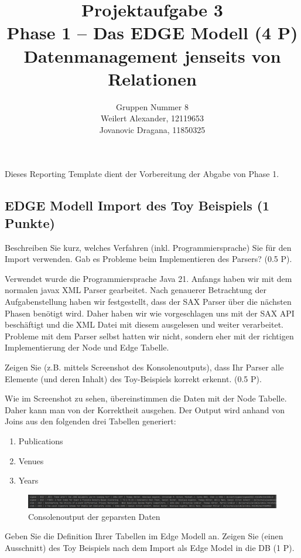 \documentclass[11pt]{scrartcl}
\title{
  \textbf{\large Projektaufgabe 3 } \\
  Phase 1 – Das EDGE Modell (4 P) \\
  {\large Datenmanagement jenseits von Relationen}
}
\author{
  Gruppen Nummer 8 \\
  \large Weilert Alexander, 12119653 \\
  \large Jovanovic Dragana, 11850325
}
\begin{document}
\maketitle\thispagestyle{empty}

Dieses Reporting Template dient der Vorbereitung der Abgabe von Phase 1.

\subsection*{EDGE Modell Import des Toy Beispiels (1 Punkte)}

Beschreiben Sie kurz, welches Verfahren (inkl. Programmiersprache) Sie für den Import verwenden. Gab es Probleme beim Implementieren des Parsers? (0.5 P).

Verwendet wurde die Programmiersprache Java 21.
Anfangs haben wir mit dem normalen javax XML Parser gearbeitet.
Nach genauerer Betrachtung der Aufgabenstellung haben wir festgestellt, dass der SAX Parser über die nächsten Phasen benötigt wird.
Daher haben wir wie vorgeschlagen uns mit der SAX API beschäftigt und die XML Datei mit diesem ausgelesen und weiter verarbeitet.
Probleme mit dem Parser selbst hatten wir nicht, sondern eher mit der richtigen Implementierung der Node und Edge Tabelle.

Zeigen Sie (z.B. mittels Screenshot des Konsolenoutputs), dass Ihr Parser alle Elemente (und deren Inhalt) des Toy-Beispiels korrekt erkennt. (0.5 P).

Wie im Screenshot zu sehen, übereinstimmen die Daten mit der Node Tabelle.
Daher kann man von der Korrektheit ausgehen.
Der Output wird anhand von Joins aus den folgenden drei Tabellen generiert:
\begin{enumerate}
    \item Publications
    \item Venues
    \item Years
\end{enumerate}
\begin{figure}[H]
    \includegraphics[width=\linewidth]{console.png}
    \caption{Consolenoutput der geparsten Daten}\label{fig:figure}
\end{figure}

\newpage
Geben Sie die Definition Ihrer Tabellen im Edge Modell an. Zeigen Sie (einen Ausschnitt) des Toy Beispiels nach dem Import als Edge Model in die DB (1 P).
\end{document}
